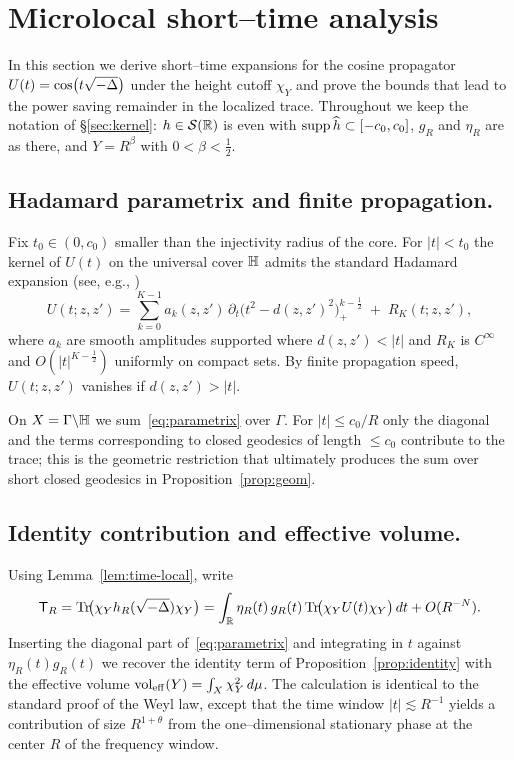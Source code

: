 \section{Microlocal short--time analysis}\label{sec:microlocal}

In this section we derive short--time expansions for the cosine propagator
$U(t)=\cos\!\big(t\sqrt{-\Delta}\big)$ under the height cutoff $\chi_Y$
and prove the bounds that lead to the power saving remainder in the
localized trace. Throughout we keep the notation of \S\ref{sec:kernel}:
$h\in\mathcal{S}(\mathbb{R})$ is even with $\operatorname{supp} \widehat{h}\subset[-c_0,c_0]$,
$g_R$ and $\eta_R$ are as there, and $Y=R^\beta$ with $0<\beta<\tfrac12$.

\subsection{Hadamard parametrix and finite propagation.}
Fix $t_0\in(0,c_0)$ smaller than the injectivity radius of the core.
For $|t|<t_0$ the kernel of $U(t)$ on the universal cover $\mathbb{H}$
admits the standard Hadamard expansion (see, e.g., \cite{zworski2012})
\begin{equation}\label{eq:parametrix}
U(t;z,z')= \sum_{k=0}^{K-1} a_k(z,z')\, \partial_t \big(t^2-d(z,z')^2\big)_{+}^{k-\frac12}
\;+\; R_K(t;z,z'),
\end{equation}
where $a_k$ are smooth amplitudes supported where $d(z,z')<|t|$ and
$R_K$ is $C^\infty$ and $O(|t|^{K-\frac12})$ uniformly on compact sets.
By finite propagation speed, $U(t;z,z')$ vanishes if $d(z,z')>|t|$.

On $X=\Gamma\backslash\mathbb{H}$ we sum~\eqref{eq:parametrix} over $\Gamma$.
For $|t|\le c_0/R$ only the diagonal and the terms corresponding to
closed geodesics of length $\le c_0$ contribute to the trace; this is
the geometric restriction that ultimately produces the sum over short
closed geodesics in Proposition~\ref{prop:geom}.

\subsection{Identity contribution and effective volume.}
Using Lemma~\ref{lem:time-local}, write
\[
\mathsf{T}_R=\mathrm{Tr}\!\big(\chi_Y h_R(\sqrt{-\Delta}) \chi_Y\big)
= \int_{\mathbb{R}}\eta_R(t)\, g_R(t)\, \mathrm{Tr}\!\big(\chi_Y U(t)\chi_Y\big)\,dt
+ O(R^{-N}).
\]
Inserting the diagonal part of~\eqref{eq:parametrix} and integrating in $t$
against $\eta_R(t)g_R(t)$ we recover the identity term of
Proposition~\ref{prop:identity} with the effective volume
$\operatorname{vol}_{\mathrm{eff}}(Y)=\int_X \chi_Y^2\,d\mu$. The calculation is identical
to the standard proof of the Weyl law, except that the time window
$|t|\lesssim R^{-1}$ yields a contribution of size $R^{1+\theta}$ from the
one--dimensional stationary phase at the center $R$ of the frequency window.

